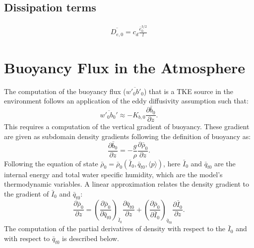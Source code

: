 \documentclass{report}
\begin{document}
\subsection{Dissipation terms} \label{sec:Dissipation}
\begin{align}
\overline{D_{e,0}} = c_{d} \frac{\bar{e}_0^{3/2}}{l}
\end{align}

\section{Buoyancy Flux in the Atmosphere}
\label{appx:high order moment terms}
The computation of the buoyancy flux ($\overline{w'_0 b'_0}$) that is a TKE source in the environment follows an application of the eddy diffusivity assumption such that:
\begin{equation}
\label{eq:vertical_eddy_diffusivty_buoyancy} 
\overline{w'_0 b_0'} \approx - K_{b, 0} \frac{\partial \bar{b}_0}{\partial z}.
\end{equation}
This requires a computation of the vertical gradient of buoyancy. These gradient are given as subdomain density gradients following the definition of buoyancy as:
\begin{equation}
\label{eq:buoyancy_grda} 
\frac{\partial \bar{b}_0}{\partial z} = - \frac{g}{\rho} \frac{\partial \bar{\rho}_0}{\partial z} .
\end{equation}
Following the equation of state $\bar{\rho}_0 = \bar{\rho}_0(\bar{I}_0, \bar{q}_{t0}, \langle p \rangle)$, here $\bar{I}_0$ and $\bar{q}_{t0}$ are the internal energy and total water  specific humidity, which are the model's thermodynamic variables. A linear approximation relates the density gradient to the gradient of $\bar{I}_0$ and $\bar{q}_{t0}$:
\begin{equation}
\label{eq:density_grad} 
\frac{\partial \bar{\rho}_0}{\partial z}  = \left( \frac{\partial \bar{\rho}_0}{\partial \bar{q}_{t0}} \right)_{\bar{I}_0} \frac{\partial \bar{q}_{t0}}{\partial z} + \left( \frac{\partial \bar{\rho}_0}{\partial \bar{I}_0}\right)_{\bar{q}_{t0}} \frac{\partial \bar{I}_0}{\partial z}  .
\end{equation}
The computation of the partial derivatives of density with respect to the $\bar{I}_0$ and with respect to $\bar{q}_{t0}$ is described below.
\end{document}
